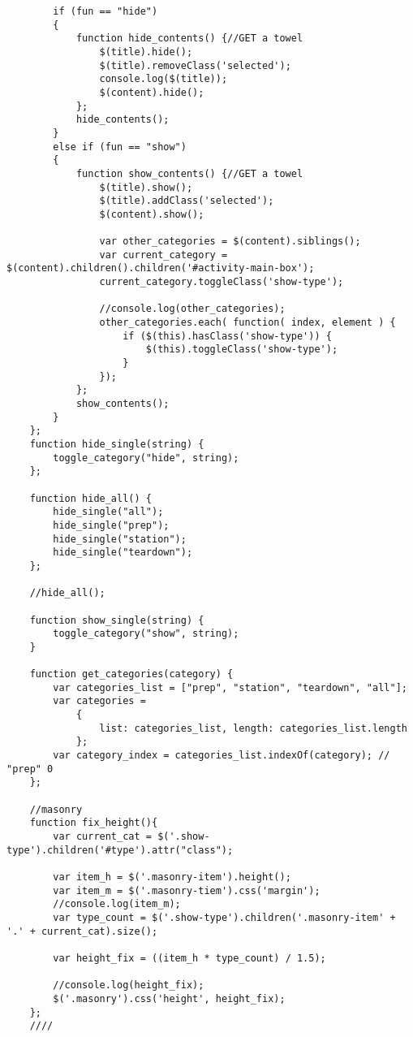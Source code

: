 \documentclass[11pt]{article}
\begin{document}
\begin{itemize}
\begin{itemize}
\begin{verbatim}
        if (fun == "hide")
        {
            function hide_contents() {//GET a towel
                $(title).hide();
                $(title).removeClass('selected');
                console.log($(title));
                $(content).hide();
            };
            hide_contents();
        }
        else if (fun == "show")
        {
            function show_contents() {//GET a towel
                $(title).show();
                $(title).addClass('selected');
                $(content).show();

                var other_categories = $(content).siblings();
                var current_category = $(content).children().children('#activity-main-box');
                current_category.toggleClass('show-type');

                //console.log(other_categories);
                other_categories.each( function( index, element ) {
                    if ($(this).hasClass('show-type')) {
                        $(this).toggleClass('show-type');
                    }
                });
            };
            show_contents();
        }
    };
    function hide_single(string) {
        toggle_category("hide", string);
    };

    function hide_all() {
        hide_single("all");
        hide_single("prep");
        hide_single("station");
        hide_single("teardown");    
    };

    //hide_all();

    function show_single(string) {
        toggle_category("show", string);
    }

    function get_categories(category) {
        var categories_list = ["prep", "station", "teardown", "all"];
        var categories =
            {
                list: categories_list, length: categories_list.length
            };
        var category_index = categories_list.indexOf(category); // "prep" 0
    };

    //masonry
    function fix_height(){
        var current_cat = $('.show-type').children('#type').attr("class");

        var item_h = $('.masonry-item').height();
        var item_m = $('.masonry-tiem').css('margin');
        //console.log(item_m);
        var type_count = $('.show-type').children('.masonry-item' + '.' + current_cat).size();

        var height_fix = ((item_h * type_count) / 1.5);

        //console.log(height_fix);
        $('.masonry').css('height', height_fix);
    };
    ////


\end{verbatim}
\end{itemize}
\end{itemize}
\end{document}
